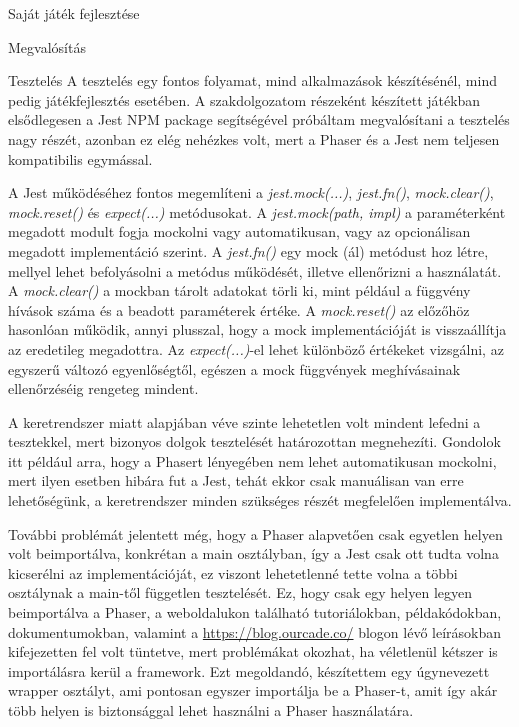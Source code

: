 \begin{MyChapter}{Saját játék fejlesztése}
\begin{MySection}{Megvalósítás}
	\end{MySection}
	
	\begin{MySection}{Tesztelés}
		A tesztelés egy fontos folyamat, mind alkalmazások készítésénél, mind pedig játékfejlesztés esetében. 
		A szakdolgozatom részeként készített játékban elsődlegesen a Jest NPM package segítségével próbáltam megvalósítani a tesztelés nagy részét, azonban ez elég nehézkes volt, mert a Phaser és a Jest nem teljesen kompatibilis egymással.
		
		A Jest működéséhez fontos megemlíteni a \textit{jest.mock(...)}, \textit{jest.fn()}, \textit{mock.clear()}, \textit{mock.reset()} és \textit{expect(...)} metódusokat.
		A \textit{jest.mock(path, impl)} a paraméterként megadott modult fogja mockolni vagy automatikusan, vagy az opcionálisan megadott implementáció szerint.
		A \textit{jest.fn()} egy mock (ál) metódust hoz létre, mellyel lehet befolyásolni a metódus működését, illetve ellenőrizni a használatát.
		A \textit{mock.clear()} a mockban tárolt adatokat törli ki, mint például a függvény hívások száma és a beadott paraméterek értéke.
		A \textit{mock.reset()} az előzőhöz hasonlóan működik, annyi plusszal, hogy a mock implementációját is visszaállítja az eredetileg megadottra.
		Az \textit{expect(...)}-el lehet különböző értékeket vizsgálni, az egyszerű változó egyenlőségtől, egészen a mock függvények meghívásainak ellenőrzéséig rengeteg mindent.
		
		A keretrendszer miatt alapjában véve szinte lehetetlen volt mindent lefedni a tesztekkel, mert bizonyos dolgok tesztelését határozottan megnehezíti.
		Gondolok itt például arra, hogy a Phasert lényegében nem lehet automatikusan mockolni, mert ilyen esetben hibára fut a Jest, tehát ekkor csak manuálisan van erre lehetőségünk, a keretrendszer minden szükséges részét megfelelően implementálva.
		
		További problémát jelentett még, hogy a Phaser alapvetően csak egyetlen helyen volt beimportálva, konkrétan a main osztályban, így a Jest csak ott tudta volna kicserélni az implementációját, ez viszont lehetetlenné tette volna a többi osztálynak a main-től független tesztelését. Ez, hogy csak egy helyen legyen beimportálva a Phaser, a weboldalukon \cite{phaser_official_website} található tutoriálokban, példakódokban, dokumentumokban, valamint a \url{https://blog.ourcade.co/} blogon lévő leírásokban kifejezetten fel volt tüntetve, mert problémákat okozhat, ha véletlenül kétszer is importálásra kerül a framework. Ezt megoldandó, készítettem egy úgynevezett wrapper osztályt, ami pontosan egyszer importálja be a Phaser-t, amit így akár több helyen is biztonsággal lehet használni a Phaser használatára.
		

\end{MySection}
\end{MyChapter}
